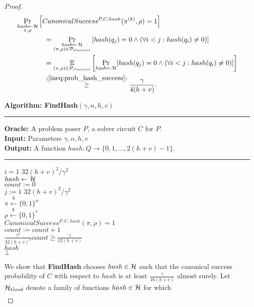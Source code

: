 \begin{proof}
\begin{align}
  \label{ineq:hash_high_prob}
&\underset{\substack{\textit{hash} \leftarrow \mathcal{H} \\ \pi, \rho}}{\Pr}\left[CanonicalSuccess^{P, C, hash}(\pi^{(k)}, \rho) = 1\right] \notag\\
&\mbox\qquad\qquad = \underset{\substack{\textit{hash} \leftarrow \mathcal{H} \\ (\pi, \rho) \in \mathcal{P}_{Success}}}{\Pr}\left[hash(q_j) = 0 \land (\forall i < j : hash(q_i) \neq 0)\right] \notag\\
&\mbox\qquad\qquad = \underset{{(\pi,\rho) \in \mathcal{P}_{Success}}}{\mathbb{E}}\left[\underset{\substack{\textit{hash} \leftarrow \mathcal{H}}}{\Pr}[hash(q_j) = 0 \land (\forall i < j : hash(q_i) \neq 0)]\right] \notag\\
&\mbox\qquad\qquad \stackrel{(\ref{ineq:prob_hash_success})}{\geq} \frac{\gamma}{4(h+v)}.
\end{align}
%
\begin{codeblock}
  \textbf{Algorithm: FindHash}$(\gamma, n, h, v)$
  \medskip
  \hrule
  \medskip
  \textbf{Oracle:} A problem poser $P$, a solver circuit $C$ for $P$.\\
  \textbf{Input:} Parameters $\gamma, n, h,v $\\
  \textbf{Output:} A function $hash:Q \rightarrow \{0,1, \dots, 2(h+v)-1 \}$.
  \medskip\hrule\medskip
  \For $i = 1$ \To $32(h+v)^2/\gamma^2$ \Do \\
  \IndI $hash \leftarrow{} \mathcal{H}$ \\
  \IndI $count := 0$ \\
  \IndI \For $j := 1$ \To $32(h+v)^2/\gamma^2$ \Do \\
  \IndII $\pi \xleftarrow{\$} \{0,1\}^{n} $\\
  \IndII $\rho \xleftarrow{\$} \{0,1\}^*$ \\
  \IndII \If $CanonicalSuccess^{P, C, hash}(\pi, \rho) = 1$ \then \\
  \IndIII $count := count + 1$\\
  \IndI \If $\frac{\gamma^2}{32(h+v)^2} count \geq \frac{\gamma}{12(h+v)}$ \then \\
  \IndII \return $hash$\\
  \return $\bot$
\end{codeblock}
We show that \textbf{FindHash} chooses $hash \in \mathcal{H}$ such that the canonical success probability of $C$
with respect to $hash$ is at least $\frac{\gamma}{16(h+v)}$ almost surely.
Let $\mathcal{H}_{Good}$ denote a family of functions $hash \in \mathcal{H}$ for which
\begin{align}

\end{align}
\end{proof}
